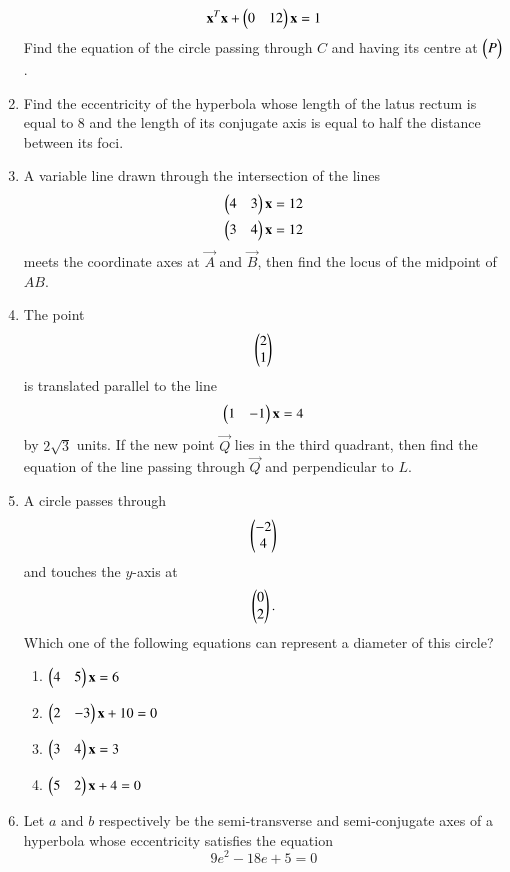 \documentclass[journal,12pt,twocolumn]{IEEEtran}
\begin{document}
\begin{enumerate}[label=\arabic*.]
\begin{equation}
\mathbf{x}^T\mathbf{x} +\begin{pmatrix}0 & 12 \end{pmatrix}\mathbf{x} 
 = 1 
\end{equation} 
Find the equation of the circle passing through $C$ and having its centre at $\begin{pmatrix}P\end{pmatrix}$. 
\item Find the eccentricity of the hyperbola whose length of the latus rectum is equal to 8 and the length of 
its conjugate axis is equal to half the distance between its foci. 
\item A variable line drawn through the 
intersection of the lines 
\begin{align} \begin{pmatrix}4 & 3\end{pmatrix}\mathbf{x} &=12 
\\ 
\begin{pmatrix}3 & 4\end{pmatrix}\mathbf{x} &=12 
\end{align} 
meets the coordinate axes at $\vec{A}$ and $\vec{B}$, then find the locus of the midpoint of $AB$. 
\item The 
point 
\begin{equation} 
\begin{pmatrix}2\\ 1\end{pmatrix} 
\end{equation} 
is translated parallel to the line 
\begin{equation} 
\begin{pmatrix}1 & -1\end{pmatrix}\mathbf{x} = 4 
\end{equation} 
% 
by $2\sqrt{3}$ units.  If the new point $\vec{Q}$ lies in the third 
quadrant, then find the equation of the line passing through $\vec{Q}$ and perpendicular to $L$. 
\item A circle passes through 
\begin{equation} 
\begin{pmatrix}-2\\ 4\end{pmatrix} 
\end{equation} 
and touches the $y$-axis at 
\begin{equation} 
\begin{pmatrix}0\\ 2\end{pmatrix}. 
\end{equation}
Which one of the  following equations can represent a diameter of this circle?
\begin{enumerate} 
\item $\begin{pmatrix}4 & 5\end{pmatrix}\mathbf{x} = 6 $
\item $\begin{pmatrix}2 & -3\end{pmatrix}\mathbf{x} +10 = 0 $
\item $\begin{pmatrix}3 & 4\end{pmatrix}\mathbf{x} = 3 $
\item $\begin{pmatrix}5 & 2\end{pmatrix}\mathbf{x} +4= 0 $
\end{enumerate} 
\item Let $a$ and $b$ respectively be the semi-transverse and semi-conjugate axes of a hyperbola whose 
eccentricity satisfies the equation
\begin{equation}
9e^2-18e+5 = 0
\end{equation}

\end{enumerate}
\end{document}
